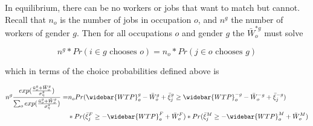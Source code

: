 \documentclass[12pt]{article}
\begin{document}






In equilibrium, there can be no workers or jobs that want to match but cannot. Recall that $n_o$ is the number of jobs in occupation $o$, and $n^g$ the number of workers of gender $g$. Then for all occupations $o$ and gender $g$ the $ \bar{W}^{*g}_o$ must solve

$$n^g*Pr(\text{$i \in g$ chooses } o)  =n_o*Pr(\text{$j \in o$ chooses } g) $$

which in terms of the choice probabilities defined above is


\begin{align*}
n^g\frac{exp(\frac{\bar{u}^{g}_o + \bar{W}^g_o}{\sigma^g_{\eta}})}{\sum_o exp(\frac{\bar{u}^{g}_o + \bar{W}^g_o}{\sigma^g_{\eta}})} =& n_oPr(\widebar{WTP}^g_o - \bar{W}^g_o + \bar{\xi}^g_j \geq \widebar{WTP}^{-g}_o - \bar{W}^{-g}_o + \bar{\xi}^{-g}_j) \\ 
& *Pr ( \bar{\xi}^F_j \geq {-\widebar{WTP}^F_o + \bar{W}^F_o} ) *Pr ( \bar{\xi}^M_j \geq {-\widebar{WTP}^M_o + \bar{W}^M_o} )     \\
\end{align*}
\end{document}
